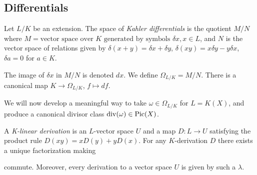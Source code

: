 \documentclass[10pt,a4paper,rgb]{article}
\begin{document}
\subsection{Differentials}
Let $L/K$ be an extension. The space of \emph{Kahler differentials} is the quotient $M/N$ where $M = \text{vector space over $K$ generated by symbols } \delta x, x \in L$, and $N$ is the vector space of relations given by $\delta(x+y)=\delta x+\delta y$, $\delta(xy) = x\delta y-y\delta x$, $\delta a =0$ for $a \in K$. 

The image of $\delta x$ in $M/N$ is denoted $dx$. We define $\Omega_{L/K} = M/N$. There is a canonical map $K \to \Omega_{L/K}$, $f \mapsto df$.

We will now develop a meaningful way to take $\omega \in \Omega_{L/K}$ for $L = K(X)$, and produce a canonical divisor class $\operatorname{div}(\omega) \in \operatorname{Pic}(X)$.

A \emph{K-linear derivation} is an $L$-vector space $U$ and a map $D: L \to U$ satisfying the product rule $D(xy) = xD(y) + yD(x)$. For any $K$-derivation $D$ there exists a unique factorization making
\begin{center}
\end{center}
commute. Moreover, every derivation to a vector space $U$ is given by such a $\lambda$.
\end{document}
